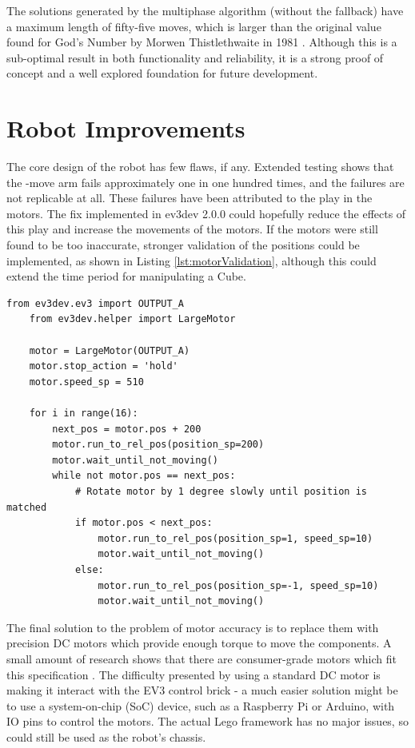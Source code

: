 \documentclass{report}
\newcommand{\move}[1]{\uppercase{\texttt{\formatmovesnospace{#1}}}-move}
\begin{document}
	The solutions generated by the multiphase algorithm (without the fallback) have a maximum length of fifty-five moves, which is larger than the original value found for God's Number by Morwen Thistlethwaite in 1981 \cite{Singmaster1981}. Although this is a sub-optimal result in both functionality and reliability, it is a strong proof of concept and a well explored foundation for future development.
	
	\section{Robot Improvements}
	
	The core design of the robot has few flaws, if any. Extended testing shows that the \move{x} arm fails approximately one in one hundred times, and the failures are not replicable at all. These failures have been attributed to the play in the motors. The fix implemented in ev3dev 2.0.0 could hopefully reduce the effects of this play and increase the movements of the motors. If the motors were still found to be too inaccurate, stronger validation of the positions could be implemented, as shown in Listing \ref{lst:motorValidation}, although this could extend the time period for manipulating a Cube. 
	
	\begin{lstlisting}[caption={Potential position validation method for the Lego motors}, label={lst:motorValidation}]
	from ev3dev.ev3 import OUTPUT_A
	from ev3dev.helper import LargeMotor
	
	motor = LargeMotor(OUTPUT_A)
	motor.stop_action = 'hold'
	motor.speed_sp = 510
	
	for i in range(16):
		next_pos = motor.pos + 200
		motor.run_to_rel_pos(position_sp=200)
		motor.wait_until_not_moving()
		while not motor.pos == next_pos:
			# Rotate motor by 1 degree slowly until position is matched
			if motor.pos < next_pos:
				motor.run_to_rel_pos(position_sp=1, speed_sp=10)
				motor.wait_until_not_moving()
			else:
				motor.run_to_rel_pos(position_sp=-1, speed_sp=10)
				motor.wait_until_not_moving()\end{lstlisting}
	
	The final solution to the problem of motor accuracy is to replace them with precision DC motors which provide enough torque to move the components. A small amount of research shows that there are consumer-grade motors which fit this specification \cite{Portescap}. The difficulty presented by using a standard DC motor is making it interact with the EV3 control brick - a much easier solution might be to use a system-on-chip (SoC) device, such as a Raspberry Pi or Arduino, with IO pins to control the motors. The actual Lego framework has no major issues, so could still be used as the robot's chassis.
\end{document}
